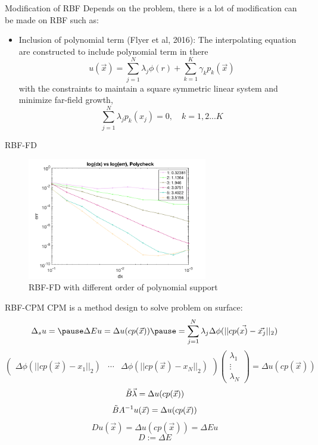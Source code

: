 \documentclass{beamer}
\begin{document}
\begin{frame}{Modification of RBF}
    Depends on the problem, there is a lot of modification can be made on RBF such as:
    \begin{itemize}
        \item \alert{Inclusion of polynomial term} (Flyer et al, 2016):
        \nextline The interpolating equation are constructed to include polynomial term in there
    $$ 
    u(\vec{x}) = \sum_{j=1}^N\lambda_j\phi(r) + \sum_{k=1}^K\gamma_k  p_k(\vec{x})
    $$
    with the constraints to maintain a square symmetric linear system and minimize far-field growth, $$\sum_{j=1}^N\lambda_j p_k(x_j) = 0,\quad k = 1,2...K$$
    
    \end{itemize}
\end{frame}

\begin{frame}{RBF-FD}
    \begin{figure}
      \includegraphics[width=0.7\textwidth]{UBC_IAM_5min_talk/Figures/RBF_FD.png}
      \caption{RBF-FD with different order of polynomial support}
    \end{figure}
\end{frame}

\begin{frame}{RBF-CPM}
    CPM is a method design to solve problem on surface:
    $$ 
    \Delta_s u = \pause \Delta Eu = \Delta u(cp(\vec{x})) \pause= \sum_{j=1}^N\lambda_j\Delta\phi(||cp(\vec{x)}-\vec{x_j}||_2)
    $$
    $$
    \begin{pmatrix}\Delta\phi(||cp(\vec{x})-x_1||_2) &
    \cdots & \Delta\phi(||cp(\vec{x})-x_N||_2)\end{pmatrix} 
    \begin{pmatrix}\lambda_1 \\ \vdots \\ \lambda_N\end{pmatrix} = \Delta u(cp(\vec{x}))
    $$
    $$\Tilde{B}\vec{\lambda}=\Delta u(cp(\vec{x}))$$
    $$\Tilde{B}A^{-1}u(\vec{x})=\Delta u(cp(\vec{x}))$$
    $$Du(\vec{x})=\Delta u(cp(\vec{x})) = \Delta Eu$$
    $$D:=\Delta E$$
\end{frame}
\end{document}

